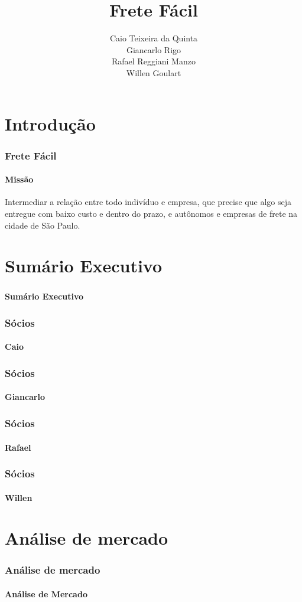 \documentclass{beamer}
\title{Frete Fácil}
\author{Caio Teixeira da Quinta\\
        Giancarlo Rigo\\
        Rafael Reggiani Manzo\\
        Willen Goulart}
\begin{document}
\maketitle

\section{Introdução}
\begin{frame}
  \frametitle{Frete Fácil}
  \framesubtitle{Missão}

  Intermediar a relação entre todo indivíduo e empresa, que precise que algo seja entregue com baixo custo e dentro do prazo, e autônomos e empresas de frete na cidade de São Paulo.

\end{frame}

\section{Sumário Executivo}
\begin{frame}
  \frametitle{}
  \framesubtitle{}

  \begin{center}
    {\huge\textbf{Sumário Executivo}}
  \end{center}
\end{frame}

\begin{frame}
  \frametitle{Sócios}
  \framesubtitle{Caio}

\end{frame}

\begin{frame}
  \frametitle{Sócios}
  \framesubtitle{Giancarlo}

\end{frame}

\begin{frame}
  \frametitle{Sócios}
  \framesubtitle{Rafael}

\end{frame}

\begin{frame}
  \frametitle{Sócios}
  \framesubtitle{Willen}

\end{frame}

\section{Análise de mercado}

\begin{frame}
  \frametitle{Análise de mercado}
  \framesubtitle{}

  \begin{center}
    {\huge\textbf{Análise de Mercado}}

  \end{center}
\end{frame}
\end{document}
